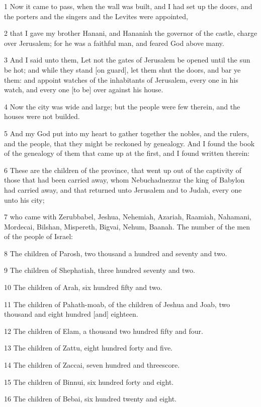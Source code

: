 \par 1 Now it came to pass, when the wall was built, and I had set up the doors, and the porters and the singers and the Levites were appointed,
\par 2 that I gave my brother Hanani, and Hananiah the governor of the castle, charge over Jerusalem; for he was a faithful man, and feared God above many.
\par 3 And I said unto them, Let not the gates of Jerusalem be opened until the sun be hot; and while they stand [on guard], let them shut the doors, and bar ye them: and appoint watches of the inhabitants of Jerusalem, every one in his watch, and every one [to be] over against his house.
\par 4 Now the city was wide and large; but the people were few therein, and the houses were not builded.
\par 5 And my God put into my heart to gather together the nobles, and the rulers, and the people, that they might be reckoned by genealogy. And I found the book of the genealogy of them that came up at the first, and I found written therein:
\par 6 These are the children of the province, that went up out of the captivity of those that had been carried away, whom Nebuchadnezzar the king of Babylon had carried away, and that returned unto Jerusalem and to Judah, every one unto his city;
\par 7 who came with Zerubbabel, Jeshua, Nehemiah, Azariah, Raamiah, Nahamani, Mordecai, Bilshan, Mispereth, Bigvai, Nehum, Baanah. The number of the men of the people of Israel:
\par 8 The children of Parosh, two thousand a hundred and seventy and two.
\par 9 The children of Shephatiah, three hundred seventy and two.
\par 10 The children of Arah, six hundred fifty and two.
\par 11 The children of Pahath-moab, of the children of Jeshua and Joab, two thousand and eight hundred [and] eighteen.
\par 12 The children of Elam, a thousand two hundred fifty and four.
\par 13 The children of Zattu, eight hundred forty and five.
\par 14 The children of Zaccai, seven hundred and threescore.
\par 15 The children of Binnui, six hundred forty and eight.
\par 16 The children of Bebai, six hundred twenty and eight.
